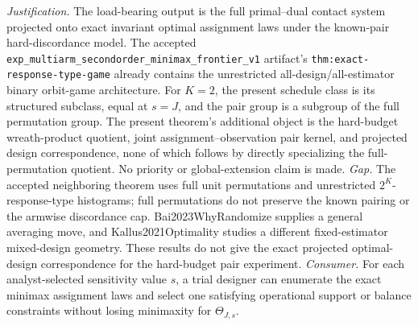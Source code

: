 \documentclass{article}
\begin{document}
\par\smallskip\noindent \textit{Justification.} The load-bearing output is the full primal--dual contact system projected onto exact invariant optimal assignment laws under the known-pair hard-discordance model. The accepted \texttt{exp\_multiarm\_secondorder\_minimax\_frontier\_v1} artifact's \texttt{thm:exact-response-type-game} already contains the unrestricted all-design/all-estimator binary orbit-game architecture. For \(K=2\), the present schedule class is its structured subclass, equal at \(s=J\), and the pair group is a subgroup of the full permutation group. The present theorem's additional object is the hard-budget wreath-product quotient, joint assignment--observation pair kernel, and projected design correspondence, none of which follows by directly specializing the full-permutation quotient. No priority or global-extension claim is made. \textit{Gap.} The accepted neighboring theorem uses full unit permutations and unrestricted \(2^K\)-response-type histograms; full permutations do not preserve the known pairing or the armwise discordance cap. Bai2023WhyRandomize supplies a general averaging move, and Kallus2021Optimality studies a different fixed-estimator mixed-design geometry. These results do not give the exact projected optimal-design correspondence for the hard-budget pair experiment. \textit{Consumer.} For each analyst-selected sensitivity value \(s\), a trial designer can enumerate the exact minimax assignment laws and select one satisfying operational support or balance constraints without losing minimaxity for \(\Theta_{J,s}\).
\end{document}
